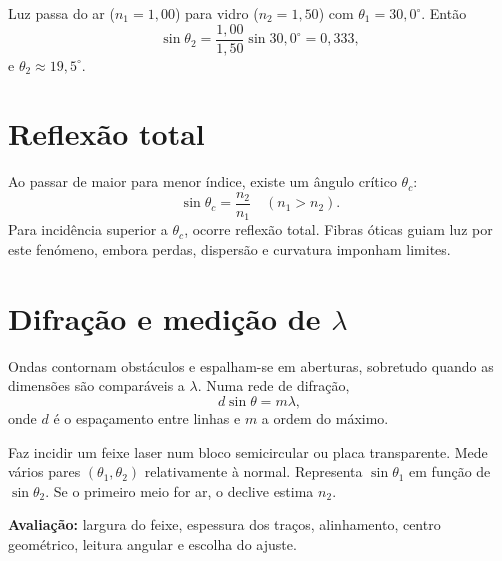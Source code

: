 \documentclass[11pt,a4paper,oneside]{book}
\begin{document}
\begin{center}
\end{center}

\begin{exemplo}[title=Exemplo resolvido — Lei de Snell]
Luz passa do ar ($n_1=1,00$) para vidro ($n_2=1,50$) com $\theta_1=30,0^\circ$. Então
\[
\sin\theta_2=\frac{1,00}{1,50}\sin30,0^\circ=0,333,
\]
e $\theta_2\approx19,5^\circ$.
\end{exemplo}

\section{Reflexão total}
Ao passar de maior para menor índice, existe um ângulo crítico $\theta_c$:
\[
\sin\theta_c=\frac{n_2}{n_1}\quad(n_1>n_2).
\]
Para incidência superior a $\theta_c$, ocorre reflexão total. Fibras óticas guiam luz por este fenómeno, embora perdas, dispersão e curvatura imponham limites.

\section{Difração e medição de \texorpdfstring{$\lambda$}{lambda}}
Ondas contornam obstáculos e espalham-se em aberturas, sobretudo quando as dimensões são comparáveis a $\lambda$. Numa rede de difração,
\[
d\sin\theta=m\lambda,
\]
onde $d$ é o espaçamento entre linhas e $m$ a ordem do máximo.

\begin{atividade}[title=Índice de refração de um material]
Faz incidir um feixe laser num bloco semicircular ou placa transparente. Mede vários pares $(\theta_1,\theta_2)$ relativamente à normal. Representa $\sin\theta_1$ em função de $\sin\theta_2$. Se o primeiro meio for ar, o declive estima $n_2$.

\textbf{Avaliação:} largura do feixe, espessura dos traços, alinhamento, centro geométrico, leitura angular e escolha do ajuste.
\end{atividade}
\end{document}
